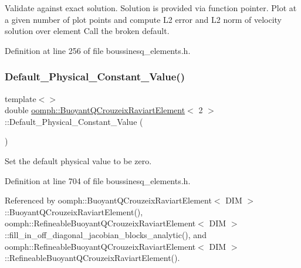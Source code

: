 Validate against exact solution. Solution is provided via function pointer. Plot at a given number of plot points and compute L2 error and L2 norm of velocity solution over element Call the broken default. 



Definition at line 256 of file boussinesq\+\_\+elements.\+h.

\mbox{\label{classoomph_1_1BuoyantQCrouzeixRaviartElement_a37e9dc4e6e5a8120a2f27587b5853086}} 
\subsubsection{\texorpdfstring{Default\+\_\+\+Physical\+\_\+\+Constant\+\_\+\+Value()}{Default\_Physical\_Constant\_Value()}\hspace{0.1cm}{\footnotesize\ttfamily [1/2]}}
{\footnotesize\ttfamily template$<$$>$ \\
double \hyperlink{classoomph_1_1BuoyantQCrouzeixRaviartElement}{oomph\+::\+Buoyant\+Q\+Crouzeix\+Raviart\+Element}$<$ 2 $>$\+::Default\+\_\+\+Physical\+\_\+\+Constant\+\_\+\+Value (\begin{DoxyParamCaption}{ }\end{DoxyParamCaption})\hspace{0.3cm}{\ttfamily [private]}}



Set the default physical value to be zero. 



Definition at line 704 of file boussinesq\+\_\+elements.\+h.



Referenced by oomph\+::\+Buoyant\+Q\+Crouzeix\+Raviart\+Element$<$ D\+I\+M $>$\+::\+Buoyant\+Q\+Crouzeix\+Raviart\+Element(), oomph\+::\+Refineable\+Buoyant\+Q\+Crouzeix\+Raviart\+Element$<$ D\+I\+M $>$\+::fill\+\_\+in\+\_\+off\+\_\+diagonal\+\_\+jacobian\+\_\+blocks\+\_\+analytic(), and oomph\+::\+Refineable\+Buoyant\+Q\+Crouzeix\+Raviart\+Element$<$ D\+I\+M $>$\+::\+Refineable\+Buoyant\+Q\+Crouzeix\+Raviart\+Element().

